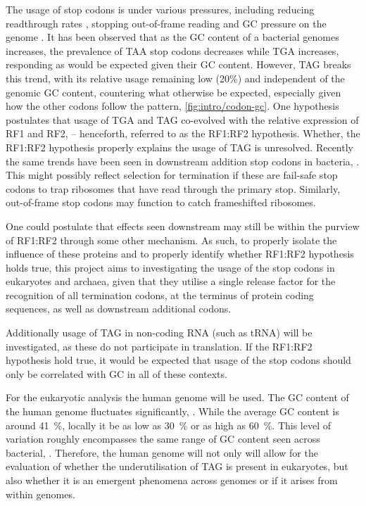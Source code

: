 \documentclass[../main.tex]{subfile}
\begin{document}
    The usage of stop codons is under various pressures, including reducing readthrough rates \autocite{Liang2005}, stopping out-of-frame reading \autocite{Tse2010} and GC pressure on the genome \autocite{Povolotskaya2012}.
    It has been observed that as the GC content of a bacterial genomes increases, the prevalence of TAA stop codons decreases while TGA increases, responding as would be expected given their GC content. However, TAG breaks this trend, with its relative usage remaining low (20\%) and independent of the genomic GC content, countering what otherwise be expected, especially given how the other codons follow the pattern, \cref{fig:intro/codon-gc}.
    One hypothesis postulates that usage of TGA and TAG co-evolved with the relative expression of RF1 and RF2, \autocite{Korkmaz2014} -- henceforth, referred to as the RF1:RF2 hypothesis. Whether, the RF1:RF2 hypothesis properly explains the usage of TAG is unresolved.
    Recently the same trends have been seen in downstream addition stop codons in bacteria, \autocite{Ho2019}. This might possibly reflect selection for termination if these are fail-safe stop codons to trap ribosomes that have read through the primary stop. Similarly, out-of-frame stop codons may function to catch frameshifted ribosomes.

    One could postulate that effects seen downstream may still be within the purview of RF1:RF2 through some other mechanism. As such, to properly isolate the influence of these proteins and to properly identify whether RF1:RF2 hypothesis holds true, this project aims to investigating the usage of the stop codons in eukaryotes and archaea, given that they utilise a single release factor for the recognition of all termination codons, at the terminus of protein coding sequences, as well as downstream additional codons.

    Additionally usage of TAG in non-coding RNA (such as tRNA) will be investigated, as these do not participate in translation. If the RF1:RF2 hypothesis hold true, it would be expected that usage of the stop codons should only be correlated with GC in all of these contexts.

    For the eukaryotic analysis the human genome will be used. The GC content of the human genome fluctuates significantly, \autocite{human2001}. While the average GC content is around \SI{41}{\percent}, locally it be as low as \SI{30}{\percent} or as high as \SI{60}{\percent}. This level of variation roughly encompasses the same range of GC content seen across bacterial, \autocite{Sueoka1962}. Therefore, the human genome will not only will allow for the evaluation of whether the underutilisation of TAG is present in eukaryotes, but also whether it is an emergent phenomena across genomes or if it arises from within genomes.
\end{document}
